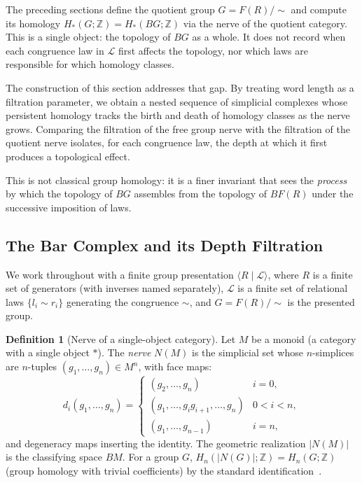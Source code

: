 \documentclass{article}
\theoremstyle{definition}
\newtheorem{definition}[theorem]{Definition}
\theoremstyle{remark}
\begin{document}
The preceding sections define the quotient group $G = F(R)/{\sim}$
and compute its homology $H_*(G;\mathbb{Z}) = H_*(BG;\mathbb{Z})$
via the nerve of the quotient category. This is a single object:
the topology of $BG$ as a whole. It does not record when
each congruence law in $\mathcal{L}$ first affects the topology,
nor which laws are responsible for which homology classes.

The construction of this section addresses that gap. By treating
word length as a filtration parameter, we obtain a nested sequence
of simplicial complexes whose persistent homology tracks the birth
and death of homology classes as the nerve grows. Comparing the
filtration of the free group nerve with the filtration of the
quotient nerve isolates, for each congruence law, the depth at
which it first produces a topological effect.

This is not classical group homology: it is a finer invariant that
sees the \emph{process} by which the topology of $BG$ assembles
from the topology of $BF(R)$ under the successive imposition of
laws.

\subsection{The Bar Complex and its Depth Filtration}

We work throughout with a finite group presentation
$\langle R \mid \mathcal{L} \rangle$, where $R$ is a finite set
of generators (with inverses named separately), $\mathcal{L}$ is
a finite set of relational laws $\{l_i \sim r_i\}$ generating the
congruence $\sim$, and $G = F(R)/{\sim}$ is the presented group.

\begin{definition}[Nerve of a single-object category]
\label{def:nerve_single}
Let $M$ be a monoid (a category with a single object $*$). The
\emph{nerve} $N(M)$ is the simplicial set whose $n$-simplices are
$n$-tuples $(g_1, \dots, g_n) \in M^n$, with face maps:
\[
  d_i(g_1, \dots, g_n) = \begin{cases}
    (g_2, \dots, g_n)                       & i = 0, \\
    (g_1, \dots, g_i g_{i+1}, \dots, g_n)   & 0 < i < n, \\
    (g_1, \dots, g_{n-1})                   & i = n,
  \end{cases}
\]
and degeneracy maps inserting the identity. The geometric
realization $|N(M)|$ is the classifying space $BM$.
For a group $G$, $H_n(|N(G)|;\mathbb{Z}) = H_n(G;\mathbb{Z})$
(group homology with trivial coefficients) by the standard
identification~\cite{maclaneHom}.
\end{definition}
\end{document}
